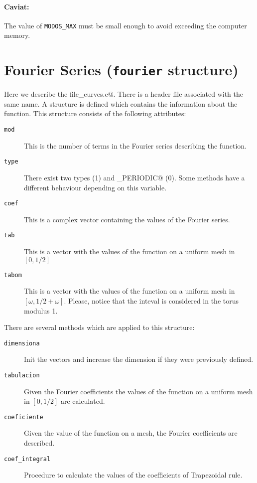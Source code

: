 \documentclass{article}
\begin{document}
\paragraph{Caviat:} The value of \texttt{MODOS\_MAX} must be small
enough to avoid exceeding the computer memory. 

\section{Fourier Series (\texttt{fourier} structure)}
Here we describe the file\verb@symmetric_curves.c@. There is a header
file associated with the same name.  A
structure is defined which contains the information about the
function. This structure consists of the following attributes: 
\begin{description}
  \item[\texttt{mod}] This is the  number of terms in the Fourier series
    describing the function.
  \item[\texttt{type}] There
exist two types \verb@SYMMETRIC@ (1) and \verb@HALF_PERIODIC@ (0). Some
methods have a different behaviour depending on this variable. 
 \item[\texttt{coef}] This is a complex vector containing the values of the
   Fourier series.
\item[\texttt{tab}] This is a vector with the values of the function on a
  uniform mesh in $[0,1/2]$
\item[\texttt{tabom}] This is a vector with the values of the function on a
  uniform mesh in $[\omega,1/2+\omega]$. Please, notice that the
  inteval is considered in the torus modulus 1. 
\end{description}
There are several methods which are applied to this structure:
\begin{description}
\item[\texttt{dimensiona}] Init the
vectors and increase the dimension if they were previously defined.
\item[\texttt{tabulacion}] Given the Fourier coefficients the values of the function on a
  uniform mesh in $[0,1/2]$ are calculated. 
\item[\texttt{coeficiente}] Given the value of the function on a mesh, the
  Fourier coefficients are described. 
\item[\texttt{coef\_integral}] Procedure to calculate the values of
  the coefficients of Trapezoidal rule. 
\end{description}
 
\end{document}
